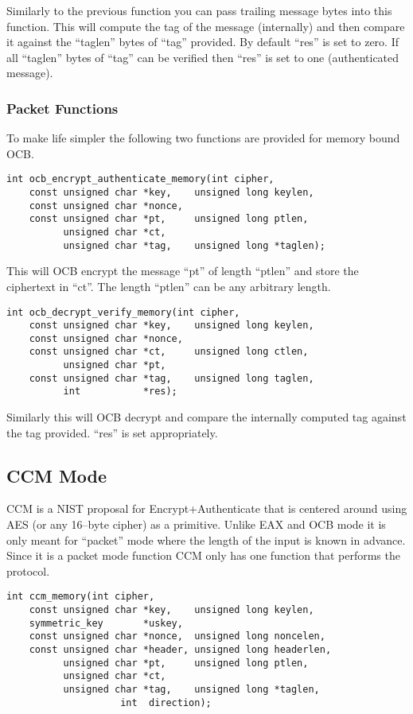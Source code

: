 \documentclass[a4paper]{book}
\begin{document}
Similarly to the previous function you can pass trailing message bytes into this function.  This will compute the 
tag of the message (internally) and then compare it against the ``taglen'' bytes of ``tag'' provided.  By default
``res'' is set to zero.  If all ``taglen'' bytes of ``tag'' can be verified then ``res'' is set to one (authenticated
message).

\subsubsection{Packet Functions}
To make life simpler the following two functions are provided for memory bound OCB.

\begin{verbatim}
int ocb_encrypt_authenticate_memory(int cipher,
    const unsigned char *key,    unsigned long keylen,
    const unsigned char *nonce,  
    const unsigned char *pt,     unsigned long ptlen,
          unsigned char *ct,
          unsigned char *tag,    unsigned long *taglen);
\end{verbatim}

This will OCB encrypt the message ``pt'' of length ``ptlen'' and store the ciphertext in ``ct''.  The length ``ptlen''
can be any arbitrary length.  

\begin{verbatim}
int ocb_decrypt_verify_memory(int cipher,
    const unsigned char *key,    unsigned long keylen,
    const unsigned char *nonce,  
    const unsigned char *ct,     unsigned long ctlen,
          unsigned char *pt,
    const unsigned char *tag,    unsigned long taglen,
          int           *res);
\end{verbatim}

Similarly this will OCB decrypt and compare the internally computed tag against the tag provided. ``res'' is set 
appropriately.

\subsection{CCM Mode}
CCM is a NIST proposal for Encrypt+Authenticate that is centered around using AES (or any 16--byte cipher) as a primitive.  Unlike EAX and OCB mode
it is only meant for ``packet'' mode where the length of the input is known in advance.  Since it is a packet mode function CCM only has one 
function that performs the protocol.

\begin{verbatim}
int ccm_memory(int cipher,
    const unsigned char *key,    unsigned long keylen,
    symmetric_key       *uskey,
    const unsigned char *nonce,  unsigned long noncelen,
    const unsigned char *header, unsigned long headerlen,
          unsigned char *pt,     unsigned long ptlen,
          unsigned char *ct,
          unsigned char *tag,    unsigned long *taglen,
                    int  direction);
\end{verbatim}
\end{document}
